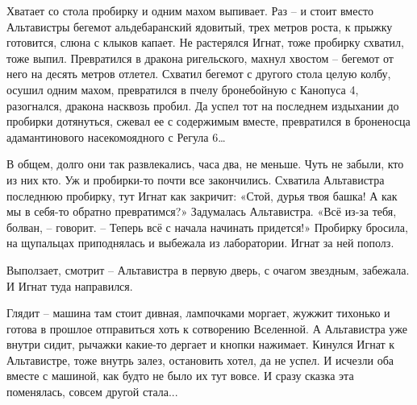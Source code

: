 \documentclass[ebook,oneside,final,openright]{memoir}
\begin{document}
\par
Хватает со стола пробирку и одним махом выпивает. Раз – и стоит вместо Альтавистры бегемот альдебаранский ядовитый, трех метров роста, к прыжку готовится, слюна с клыков капает. Не растерялся Игнат, тоже пробирку схватил, тоже выпил. Превратился в дракона ригельского, махнул хвостом – бегемот от него на десять метров отлетел. Схватил бегемот с другого стола целую колбу, осушил одним махом, превратился в пчелу бронебойную с Канопуса 4, разогнался, дракона насквозь пробил. Да успел тот на последнем издыхании до пробирки дотянуться, сжевал ее с содержимым вместе, превратился в броненосца адамантинового насекомоядного с Регула 6…\par
\par
В общем, долго они так развлекались, часа два, не меньше. Чуть не забыли, кто из них кто. Уж и пробирки-то почти все закончились. Схватила Альтавистра последнюю пробирку, тут Игнат как закричит: «Стой, дурья твоя башка! А как мы в себя-то обратно превратимся?» Задумалась Альтавистра. «Всё из-за тебя, болван, – говорит. – Теперь всё с начала начинать придется!» Пробирку бросила, на щупальцах приподнялась и выбежала из лаборатории. Игнат за ней пополз.\par
\par
Выползает, смотрит – Альтавистра в первую дверь, с очагом звездным, забежала. И Игнат туда направился.\par
\par
Глядит – машина там стоит дивная, лампочками моргает, жужжит тихонько и готова в прошлое отправиться хоть к сотворению Вселенной. А Альтавистра уже внутри сидит, рычажки какие-то дергает и кнопки нажимает. Кинулся Игнат к Альтавистре, тоже внутрь залез, остановить хотел, да не успел. И исчезли оба вместе с машиной, как будто не было их тут вовсе. И сразу сказка эта поменялась, совсем другой стала...\par
\end{document}
